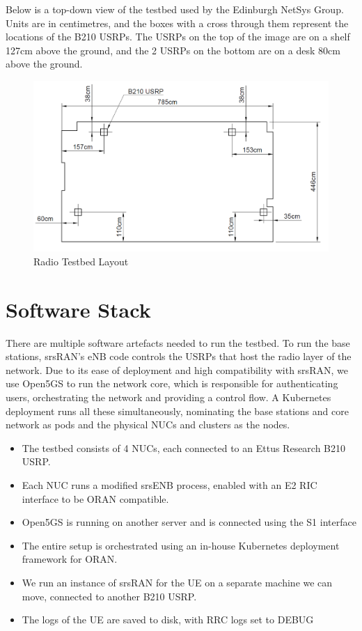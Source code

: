Below is a top-down view of the testbed used by the Edinburgh NetSys Group. Units are in centimetres, and the boxes with a cross through them represent the locations of the B210 USRPs. The USRPs on the top of the image are on a shelf 127cm above the ground, and the 2 USRPs on the bottom are on a desk 80cm above the ground.

\begin{figure}[!h]
    \centering
    \includegraphics[width=1\linewidth]{src//img/room117tesbed.png}
    \caption{Radio Testbed Layout}
    \label{fig:appendix:testbed-drawing}
\end{figure}

\section{Software Stack} \label{sec:research-software-stack}
There are multiple software artefacts needed to run the testbed. To run the base stations, srsRAN's eNB code controls the USRPs that host the radio layer of the network. Due to its ease of deployment and high compatibility with srsRAN, we use Open5GS to run the network core, which is responsible for authenticating users, orchestrating the network and providing a control flow. A Kubernetes deployment runs all these simultaneously, nominating the base stations and core network as pods and the physical NUCs and clusters as the nodes.


\begin{itemize}
    \item The testbed consists of 4 NUCs, each connected to an Ettus Research B210 USRP. 
    \item Each NUC runs a modified srsENB process, enabled with an E2 RIC interface to be ORAN compatible. 
    \item Open5GS is running on another server and is connected using the S1 interface
    \item The entire setup is orchestrated using an in-house Kubernetes deployment framework for ORAN.
    \item We run an instance of srsRAN for the UE on a separate machine we can move, connected to another B210 USRP.
    \item The logs of the UE are saved to disk, with RRC logs set to DEBUG
\end{itemize}

